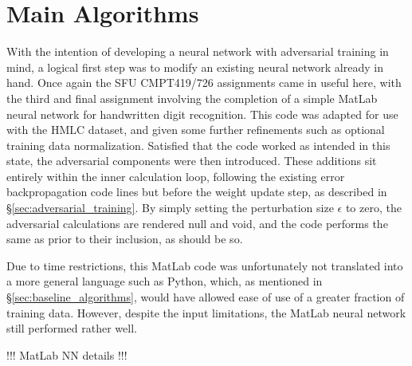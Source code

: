 \documentclass{article} %
\begin{document}

\section{Main Algorithms}
\label{sec:main_algorithms}

With the intention of developing a neural network with adversarial training in mind, a logical first step was to modify an existing neural network already in hand. Once again the SFU CMPT419/726 assignments came in useful here, with the third and final assignment involving the completion of a simple MatLab neural network for handwritten digit recognition. This code was adapted for use with the HMLC dataset, and given some further refinements such as optional training data normalization. Satisfied that the code worked as intended in this state, the adversarial components were then introduced. These additions sit entirely within the inner calculation loop, following the existing error backpropagation code lines but before the weight update step, as described in \S\ref{sec:adversarial_training}. By simply setting the perturbation size $\epsilon$ to zero, the adversarial calculations are rendered null and void, and the code performs the same as prior to their inclusion, as should be so.

Due to time restrictions, this MatLab code was unfortunately not translated into a more general language such as Python, which, as mentioned in \S\ref{sec:baseline_algorithms}, would have allowed ease of use of a greater fraction of training data. However, despite the input limitations, the MatLab neural network still performed rather well.

!!! MatLab NN details !!!
\end{document}
